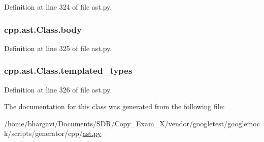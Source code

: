 Definition at line 324 of file ast.\+py.

\subsubsection[{\texorpdfstring{body}{body}}]{\setlength{\rightskip}{0pt plus 5cm}cpp.\+ast.\+Class.\+body}\hypertarget{classcpp_1_1ast_1_1_class_add39f61fdcf6dae42d79cac3dcbb7782}{}\label{classcpp_1_1ast_1_1_class_add39f61fdcf6dae42d79cac3dcbb7782}


Definition at line 325 of file ast.\+py.

\subsubsection[{\texorpdfstring{templated\+\_\+types}{templated_types}}]{\setlength{\rightskip}{0pt plus 5cm}cpp.\+ast.\+Class.\+templated\+\_\+types}\hypertarget{classcpp_1_1ast_1_1_class_a48ed0d3115656554d9134bc1787390fa}{}\label{classcpp_1_1ast_1_1_class_a48ed0d3115656554d9134bc1787390fa}


Definition at line 326 of file ast.\+py.



The documentation for this class was generated from the following file\+:\begin{DoxyCompactItemize}
\item 
/home/bhargavi/\+Documents/\+S\+D\+R/\+Copy\+\_\+\+Exam\+\_\+X/vendor/googletest/googlemock/scripts/generator/cpp/\hyperlink{ast_8py}{ast.\+py}\end{DoxyCompactItemize}
